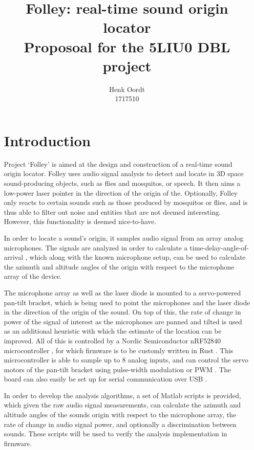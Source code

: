 \documentclass[a4paper]{article}
\begin{document}
\title{{Folley: real-time sound origin locator} \\\large {Proposoal for the 5LIU0 DBL project}}
\author{{Henk Oordt} \hfill
\\
{1717510} \hfill}

\maketitle

\section{Introduction}
Project `Folley' is aimed at the design and construction of a real-time sound origin locator. Folley uses audio signal analysis to detect and locate in 3D space sound-producing objects, such as flies and mosquitos, or speech. It then aims a low-power laser pointer in the direction of the origin of the. Optionally, Folley only reacts to certain sounds such as those produced by mosquitos or flies, and is thus able to filter out noise and entities that are not deemed interesting. However, this functionality is deemed nice-to-have.

In order to locate a sound's origin, it samples audio signal from an array analog microphones. The signals are analyzed in order to calculate a time-delay-angle-of-arrival \cite{6327613}, which along with the known microphone setup, can be used to calculate the azimuth and altitude angles of the origin with respect to the microphone array of the device.

The microphone array as well as the laser diode is mounted to a servo-powered pan-tilt bracket, which is being used to point the microphones and the laser diode in the direction of the origin of the sound. On top of this, the rate of change in power of the signal of interest as the microphones are panned and tilted is used as an additional heuristic with which the estimate of the location can be improved. All of this is controlled by a Nordic Semiconductor nRF52840 microcontroller \cite{nrf52840-dk}, for which firmware is to be customly written in Rust \cite{rust}. This microcontroller is able to sample up to 8 analog inputs, and can control the servo motors of the pan-tilt bracket using pulse-width modulation or PWM \cite{GULYAEV20161529}. The board can also easily be set up for serial communication over USB \cite{usb}.

In order to develop the analysis algorithms, a set of Matlab \cite{matlab} scripts is provided, which given the raw audio signal measurements, can calculate the azimuth and altitude angles of the sounds origin with respect to the microphone array, the rate of change in audio signal power, and optionally a discrimination between sounds. These scripts will be used to verify the analysis implementation in firmware.
\end{document}
